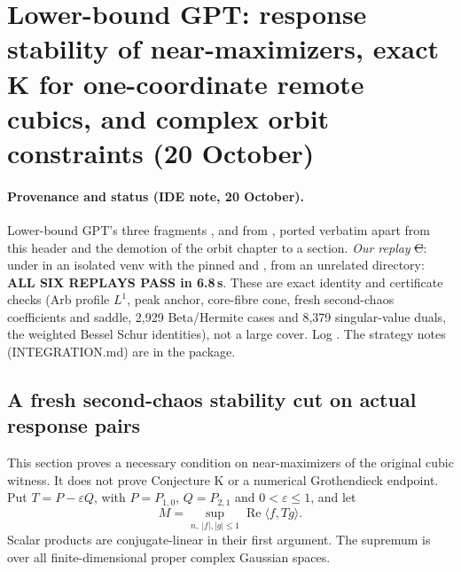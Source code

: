 \section{Lower-bound GPT: response stability of near-maximizers, exact K for one-coordinate remote cubics, and complex orbit constraints (20 October)}\label{ch:response-stability}

\paragraph{Provenance and status (IDE note, 20 October).} Lower-bound GPT's three fragments ,  and
 from , ported verbatim apart from this header and the demotion of the orbit chapter to a section.
\emph{Our replay} \st{C}:  under  in an isolated venv with the pinned  and , from an unrelated directory:
\textbf{ALL SIX REPLAYS PASS in 6.8\,s}. These are exact identity and certificate checks (Arb profile $L^1$, peak anchor, core-fibre cone, fresh second-chaos coefficients and saddle,
2{,}929 Beta/Hermite cases and 8{,}379 singular-value duals, the weighted Bessel Schur identities), not a large cover. Log .
The strategy notes (INTEGRATION.md) are in the package.
\providecommand{\eps}{\varepsilon}\providecommand{\ph}{\operatorname{phase}}

\subsection{A fresh second-chaos stability cut on actual response pairs}
\label{sec:fresh-second-chaos-stability}

This section proves a necessary condition on near-maximizers of the
original cubic witness. It does not prove Conjecture K or a numerical
Grothendieck endpoint. Put $T=P-\varepsilon Q$, with
$P=P_{1,0}$, $Q=P_{2,1}$ and $0<\varepsilon\le1$, and let
\[
 M=\sup_{n,\ |f|,|g|\le1}\operatorname{Re}\langle f,Tg\rangle.
\]
Scalar products are conjugate-linear in their first argument. The
supremum is over all finite-dimensional proper complex Gaussian spaces.

